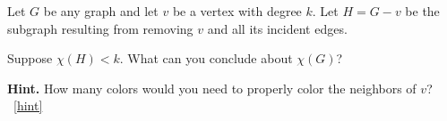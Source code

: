 \documentclass{book}
\begin{document}
\setcounter{project}{44}
\addtocounter{project}{-1}
\begin{activity}[]\label{activity-37}
\hypertarget{p-401}{}%
Let \(G\) be any graph and let \(v\) be a vertex with degree \(k\).  Let \(H = G - v\) be the subgraph resulting from removing \(v\) and all its incident edges.%
\par
\hypertarget{p-402}{}%
Suppose \(\chi(H) \lt k\).  What can you conclude about \(\chi(G)\)?%
\par\smallskip%
\noindent\textbf{Hint.}\hypertarget{hint-18}{}\quad%
\hypertarget{p-403}{}%
How many colors would you need to properly color the neighbors of \(v\)?%
~\hfill{\tiny\hyperlink{a-44}{[hint]}\hypertarget{q-44}{}}\end{activity}

\clearpage
\end{document}
